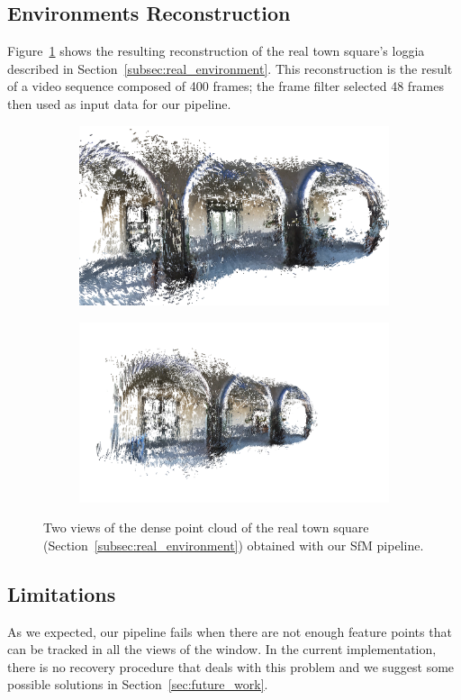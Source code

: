 \subsection{Environments Reconstruction}
Figure~\ref{fig:real_reconstruction} shows the resulting reconstruction of the
real town square's loggia described in Section~\ref{subsec:real_environment}.
This reconstruction is the result of a video sequence composed of 400 frames;
the frame filter selected 48 frames then used as input data for our pipeline.
%
\begin{figure}[h]
\centering
	\begin{subfigure}{\linewidth}
		\centering
		\includegraphics[width=\linewidth]{img/reconstruction00.png}
	\end{subfigure}
	\begin{subfigure}{\linewidth}
		\centering
		\includegraphics[width=\linewidth]{img/reconstruction01.png}
	\end{subfigure}
	\caption{Two views of the dense point cloud of the real town square
	(Section~\ref{subsec:real_environment}) obtained with our SfM pipeline.}
	\label{fig:real_reconstruction}
\end{figure}

\subsection{Limitations}\label{subsec:limitations}
As we expected, our pipeline fails when there are not enough feature points
that can be tracked in all the views of the window.
In the current implementation, there is no recovery procedure that deals with
this problem and we suggest some possible solutions in
Section~\ref{sec:future_work}.
